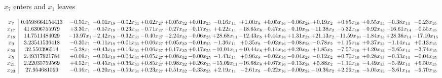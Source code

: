 \documentclass[9pt]{article}
\begin{document}
 $ x_{7} $ enters and $ x_{1} $ leaves 

 \[\begin{array}{c| c c@{\hskip 2pt} c@{\hskip 2pt} c@{\hskip 2pt} c@{\hskip 2pt} c@{\hskip 2pt} c@{\hskip 2pt} c@{\hskip 2pt} c@{\hskip 2pt} c@{\hskip 2pt} c@{\hskip 2pt} c@{\hskip 2pt} c@{\hskip 2pt} c@{\hskip 2pt} c@{\hskip 2pt} c@{\hskip 2pt} }
 x_{7}   &  0.0598664154413 & -0.50 x_{1} & -0.01 x_{19} & -0.02 x_{31} & +  0.02 x_{27} & +  0.05 x_{32} & +  0.01 x_{25} & -0.16 x_{11} & +  1.00 x_{8} & +  0.05 x_{16} & -0.06 x_{28} & +  0.19 x_{2} & +  0.85 x_{10} & +  0.55 x_{13} & -0.38 x_{14} & -0.23 x_{15}\\
 x_{17}   &  41.6306755979 & +  3.30 x_{1} & -0.57 x_{19} & -0.23 x_{31} & -0.71 x_{27} & -0.27 x_{32} & -0.17 x_{25} & +  4.22 x_{11} & -18.65 x_{8} & -0.47 x_{16} & -0.10 x_{28} & -11.38 x_{2} & -5.32 x_{10} & -0.92 x_{13} & -16.61 x_{14} & -0.55 x_{15}\\
 x_{18}   &  14.7511484029 & -13.97 x_{1} & +  2.42 x_{19} & -0.32 x_{31} & -0.40 x_{27} & -2.24 x_{32} & -0.06 x_{25} & + 28.68 x_{11} & -12.43 x_{8} & +  0.44 x_{16} & +  1.31 x_{28} & + 21.13 x_{2} & -11.59 x_{10} & -1.84 x_{13} & + 28.36 x_{14} & -17.10 x_{15}\\
 x_{9}   &  3.23541536418 & -0.30 x_{1} & -0.11 x_{19} & +  0.01 x_{31} & +  0.06 x_{27} & +  0.05 x_{32} & -0.01 x_{25} & -1.36 x_{11} & +  0.35 x_{8} & -0.02 x_{16} & -0.08 x_{28} & -0.78 x_{2} & +  1.15 x_{10} & +  0.37 x_{13} & -1.14 x_{14} & +  0.13 x_{15}\\
 x_{20}   &  32.550396514 & -5.28 x_{1} & +  0.43 x_{19} & +  0.16 x_{31} & +  0.06 x_{27} & +  0.17 x_{32} & +  0.17 x_{25} & -10.01 x_{11} & + 10.44 x_{8} & +  0.14 x_{16} & +  0.20 x_{28} & +  1.85 x_{2} & -7.57 x_{10} & +  4.20 x_{13} & -3.65 x_{14} & -3.74 x_{15}\\
 x_{5}   &  2.49317921784 & +  0.09 x_{1} & -0.03 x_{19} & +  0.04 x_{31} & +  0.05 x_{27} & +  0.08 x_{32} & -0.00 x_{25} & -1.43 x_{11} & +  0.96 x_{8} & -0.02 x_{16} & -0.04 x_{28} & -0.12 x_{2} & +  0.70 x_{10} & +  0.28 x_{13} & -0.33 x_{14} & -0.04 x_{15}\\
 x_{21}   &  2.22035759569 & +  4.52 x_{1} & -0.45 x_{19} & +  0.36 x_{31} & +  0.85 x_{27} & +  0.98 x_{32} & +  0.26 x_{25} & -15.09 x_{11} & + 16.68 x_{8} & +  0.67 x_{16} & -0.13 x_{28} & +  5.88 x_{2} & -1.10 x_{10} & -4.49 x_{13} & -5.49 x_{14} & +  6.50 x_{15}\\
 x_{23}   &  27.954681599 & -0.16 x_{1} & -0.20 x_{19} & -0.59 x_{31} & +  0.23 x_{27} & +  0.51 x_{32} & -0.33 x_{25} & +  2.19 x_{11} & -2.61 x_{8} & -0.22 x_{16} & -0.00 x_{28} & -10.36 x_{2} & +  2.29 x_{10} & -5.05 x_{13} & -3.61 x_{14} & -9.70 x_{15}\\

\end{array}\]
\end{document}
